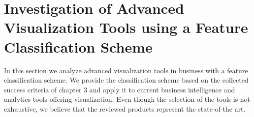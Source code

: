 \section{Investigation of Advanced Visualization Tools using a Feature Classification Scheme}
In this section we analyze advanced visualization tools in business with a feature classification scheme. We provide the classification scheme based on the collected success criteria of chapter 3 and apply it to current business intelligence and analytics tools offering visualization. Even though the selection of the tools is not exhaustive, we believe that the reviewed products represent the state-of-the art. 



